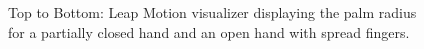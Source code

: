 \documentclass[review]{acmsiggraph}
\begin{document}
\begin{figure}
\centering
{}
\vspace{-0.1cm}
\caption{Top to Bottom: Leap Motion visualizer displaying the palm radius for a partially closed hand and an open hand with spread fingers.\label{HighLevel}}
\vspace{-0.5cm}
\end{figure}
\end{document}
